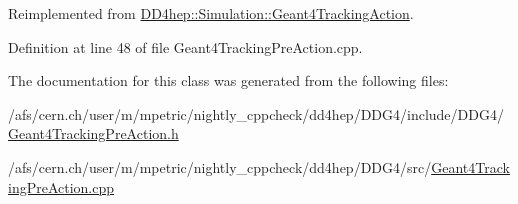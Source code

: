 Reimplemented from \hyperlink{class_d_d4hep_1_1_simulation_1_1_geant4_tracking_action_a29f980c180576781771ea325b4a73f14}{DD4hep::Simulation::Geant4TrackingAction}.

Definition at line 48 of file Geant4TrackingPreAction.cpp.

The documentation for this class was generated from the following files:\begin{DoxyCompactItemize}
\item 
/afs/cern.ch/user/m/mpetric/nightly\_\-cppcheck/dd4hep/DDG4/include/DDG4/\hyperlink{_geant4_tracking_pre_action_8h}{Geant4TrackingPreAction.h}\item 
/afs/cern.ch/user/m/mpetric/nightly\_\-cppcheck/dd4hep/DDG4/src/\hyperlink{_geant4_tracking_pre_action_8cpp}{Geant4TrackingPreAction.cpp}\end{DoxyCompactItemize}
